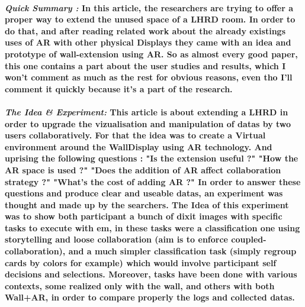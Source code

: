 \documentclass{article}
\begin{document}
    \paragraph{ \textit{Quick Summary :} 
                \newline
                \indent \indent \textnormal{In this article, the researchers are trying to offer a proper way to extend the unused space
                of a LHRD room. In order to do that, and after reading related work about the already existings uses of AR with other physical Displays
                they came with an idea and prototype of wall-extension using AR. }
                \indent \indent \textnormal{So as almost every good paper, this one contains a part about the user studies and results, which I won't 
                comment as much as the rest for obvious reasons, even tho I'll comment it quickly because it's a part of the research.} }
    
    \paragraph{ \textit{The Idea \& Experiment:} 
                \newline
                \indent \indent \textnormal{This article is about extending a LHRD in order to upgrade the vizualisation and manipulation of datas by two
                users collaboratively. For that the idea was to create a Virtual environment around the WallDisplay using AR technology. And uprising the following questions :
                \newline \indent "Is the extension useful ?" 
                \newline \indent "How the AR space is used ?"
                \newline \indent "Does the addition of AR affect collaboration strategy ?"
                \newline \indent "What's the cost of adding AR ?"}
                \indent \indent \textnormal{In order to answer these questions and produce clear and useable datas, an experiment was thought and made up by the searchers. 
                The Idea of this experiment was to show both participant a bunch of dixit images with specific tasks to execute with em, in these tasks were a classification 
                one using storytelling and loose collaboration (aim is to enforce coupled-collaboration), and a much simpler classification task (simply regroup cards by colors 
                for example) which would involve participant self decisions and selections. Moreover, tasks have been done with various contexts, some realized only with the wall,
                and others with both Wall+AR, in order to compare properly the logs and collected datas.}}
\end{document}
